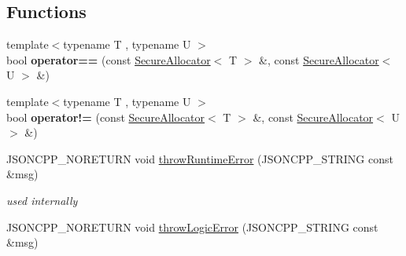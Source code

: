 \subsection*{Functions}
\begin{DoxyCompactItemize}
\item 
{\footnotesize template$<$typename T , typename U $>$ }\\bool {\bfseries operator==} (const \hyperlink{classJson_1_1SecureAllocator}{Secure\+Allocator}$<$ T $>$ \&, const \hyperlink{classJson_1_1SecureAllocator}{Secure\+Allocator}$<$ U $>$ \&)\hypertarget{namespaceJson_a85a761cd8643a538387c0fe37bb937e8}{}\label{namespaceJson_a85a761cd8643a538387c0fe37bb937e8}

\item 
{\footnotesize template$<$typename T , typename U $>$ }\\bool {\bfseries operator!=} (const \hyperlink{classJson_1_1SecureAllocator}{Secure\+Allocator}$<$ T $>$ \&, const \hyperlink{classJson_1_1SecureAllocator}{Secure\+Allocator}$<$ U $>$ \&)\hypertarget{namespaceJson_a86063654ac54c5e00f2f559f2c363b4e}{}\label{namespaceJson_a86063654ac54c5e00f2f559f2c363b4e}

\item 
J\+S\+O\+N\+C\+P\+P\+\_\+\+N\+O\+R\+E\+T\+U\+RN void \hyperlink{namespaceJson_a0ab7ff7f99788262d92d9ff3d924e065}{throw\+Runtime\+Error} (J\+S\+O\+N\+C\+P\+P\+\_\+\+S\+T\+R\+I\+NG const \&msg)\hypertarget{namespaceJson_a0ab7ff7f99788262d92d9ff3d924e065}{}\label{namespaceJson_a0ab7ff7f99788262d92d9ff3d924e065}

\begin{DoxyCompactList}\small\item\em used internally \end{DoxyCompactList}\item 
J\+S\+O\+N\+C\+P\+P\+\_\+\+N\+O\+R\+E\+T\+U\+RN void \hyperlink{namespaceJson_a27790f21f17922fac81e7cd72a5659a5}{throw\+Logic\+Error} (J\+S\+O\+N\+C\+P\+P\+\_\+\+S\+T\+R\+I\+NG const \&msg)\hypertarget{namespaceJson_a27790f21f17922fac81e7cd72a5659a5}{}\label{namespaceJson_a27790f21f17922fac81e7cd72a5659a5}


\end{DoxyCompactItemize}
